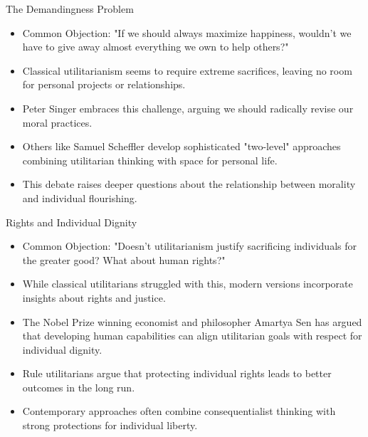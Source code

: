 \documentclass[aspectratio=169]{beamer}
\begin{document}
\begin{frame}{The Demandingness Problem}
\begin{itemize}
    \item Common Objection: "If we should always maximize happiness, wouldn't we have to give away almost everything we own to help others?"
    \item Classical utilitarianism seems to require extreme sacrifices, leaving no room for personal projects or relationships.
    \item Peter Singer embraces this challenge, arguing we should radically revise our moral practices.
    \item Others like Samuel Scheffler develop sophisticated "two-level" approaches combining utilitarian thinking with space for personal life.
    \item This debate raises deeper questions about the relationship between morality and individual flourishing.
\end{itemize}
\end{frame}

\begin{frame}{Rights and Individual Dignity}
\begin{itemize}
    \item Common Objection: "Doesn't utilitarianism justify sacrificing individuals for the greater good? What about human rights?"
    \item While classical utilitarians struggled with this, modern versions incorporate insights about rights and justice.
    \item The Nobel Prize winning economist and philosopher Amartya Sen has argued that developing human capabilities can align utilitarian goals with respect for individual dignity.
    \item Rule utilitarians argue that protecting individual rights leads to better outcomes in the long run.
    \item Contemporary approaches often combine consequentialist thinking with strong protections for individual liberty.
\end{itemize}
\end{frame}
\end{document}
